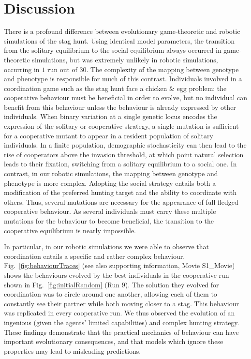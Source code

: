 \section{Discussion}
\label{discussion}
  There is a profound difference between evolutionary game-theoretic and robotic simulations of the stag hunt. Using identical model parameters, the transition from the solitary equilibrium to the social equilibrium always occurred in game-theoretic simulations, but was extremely unlikely in robotic simulations, occurring in $1$ run out of $30$. The complexity of the mapping between genotype and phenotype is responsible for much of this contrast. Individuals involved in a coordination game such as the stag hunt face a chicken \& egg problem: the cooperative behaviour must be beneficial in order to evolve, but no individual can benefit from this behaviour unless the behaviour is already expressed by other individuals. When binary variation at a single genetic locus encodes the expression of the solitary or cooperative strategy, a single mutation is sufficient for a cooperative mutant to appear in a resident population of solitary individuals. In a finite population, demographic stochasticity can then lead to the rise of cooperators above the invasion threshold, at which point natural selection leads to their fixation, switching from a solitary equilibrium to a social one. In contrast, in our robotic simulations, the mapping between genotype and phenotype is more complex. Adopting the social strategy entails both a modification of the preferred hunting target and the ability to coordinate with others. Thus, several mutations are necessary for the appearance of full-fledged cooperative behaviour. As several individuals must carry these multiple mutations for the behaviour to become beneficial, the transition to the cooperative equilibrium is nearly impossible.

  In particular, in our robotic simulations we were able to observe that coordination entails a specific and rather complex behaviour. Fig.~\ref{fig:behaviourTraces} (see also supporting information, Movie S1\_Movie) shows the behaviours evolved by the best individuals in the cooperative run shown in Fig.~\ref{fig:initialRandom} (Run $9$). The solution they evolved for coordination was to circle around one another, allowing each of them to constantly see their partner while both moving closer to a stag. This behaviour was replicated in every cooperative run. We thus observed the evolution of an ingenious (given the agents' limited capabilities) and complex hunting strategy. These findings demonstrate that the practical mechanics of behaviour can have important evolutionary consequences, and that models which ignore these properties may lead to misleading predictions.

